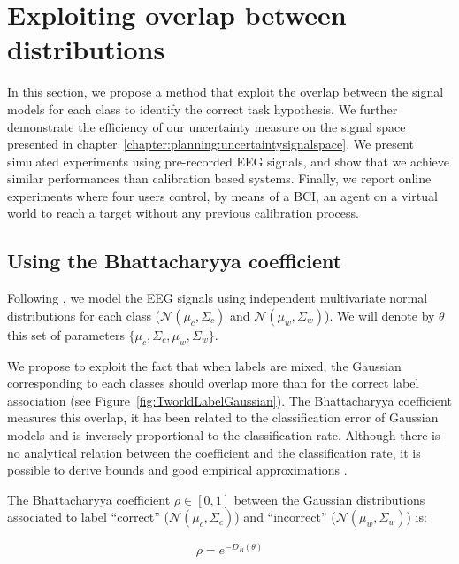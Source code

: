 
\section{Exploiting overlap between distributions}
\label{chapter:limitations:overlap}

In this section, we propose a method that exploit the overlap between the signal models for each class to identify the correct task hypothesis. We further demonstrate the efficiency of our uncertainty measure on the signal space presented in chapter~\ref{chapter:planning:uncertaintysignalspace}. We present simulated experiments using pre-recorded EEG signals, and show that we achieve similar performances than calibration based systems. Finally, we report online experiments where four users control, by means of a BCI, an agent on a virtual world to reach a target without any previous calibration process.

\subsection{Using the Bhattacharyya coefficient}

Following \cite{lotte2007review,blankertz2010single}, we model the EEG signals using independent multivariate normal distributions for each class ($\mathcal{N}(\mu_c, \Sigma_c)$ and $\mathcal{N}(\mu_w, \Sigma_w)$). We will denote by $\theta$ this set of parameters $\{\mu_c, \Sigma_c,\mu_w, \Sigma_w\}$.

We propose to exploit the fact that when labels are mixed, the Gaussian corresponding to each classes should overlap more than for the correct label association (see Figure~\ref{fig:TworldLabelGaussian}). The Bhattacharyya coefficient measures this overlap, it has been related to the classification error of Gaussian models \cite{Kailath67} and is inversely proportional to the classification rate. Although there is no analytical relation between the coefficient and the classification rate, it is possible to derive bounds and good empirical approximations \cite{lee2000bayes}.

The Bhattacharyya coefficient $\rho \in [0,1]$ between the Gaussian distributions associated to label ``correct'' ($\mathcal{N}(\mu_c, \Sigma_c)$) and ``incorrect'' ($\mathcal{N}(\mu_w, \Sigma_w)$) is:

\begin{eqnarray}
\rho = e^{-D_B(\theta)}
\end{eqnarray}

